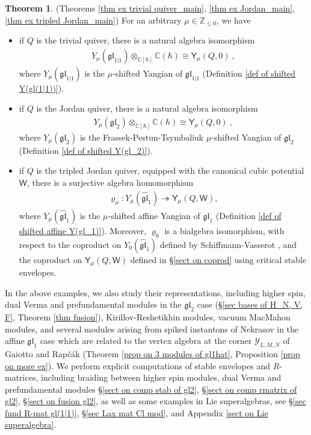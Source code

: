 \documentclass[10pt]{amsart}
\theoremstyle{definition}
\newtheorem{Theorem}{Theorem}[section]
\numberwithin{equation}{section}
\newcommand{\bC}{\mathbb{C}}
\newcommand{\bZ}{\mathbb{Z}}
\newcommand{\sW}{\mathsf{W}}
\begin{document}
\begin{Theorem}(Theorems \ref{thm ex trivial quiver_main}, \ref{thm ex Jordan_main}, \ref{thm ex tripled Jordan_main})
For an arbitrary $\mu\in \bZ_{\leqslant 0}$, we have 
\begin{itemize}
    \item if $Q$ is the trivial quiver, there is a natural algebra isomorphism
\begin{align*}
    Y_{\mu}(\mathfrak{gl}_{1|1})\otimes_{\bC[\hbar]} \bC(\hbar)\cong \mathsf Y_{\mu}(Q,0)\:,
\end{align*}
where $Y_{\mu}(\mathfrak{gl}_{1|1})$ is the 
$\mu$-shifted Yangian of $\mathfrak{gl}_{1|1}$ (Definition \ref{def of shifted Y(gl(1|1))}).
    \item if $Q$ is the Jordan quiver, there is a natural algebra isomorphism
\begin{align*}
    Y_{\mu}(\mathfrak{gl}_2)\otimes_{\bC[\hbar]} \bC(\hbar)\cong \mathsf Y_{\mu}(Q,0)\:,
\end{align*}
where $Y_{\mu}(\mathfrak{gl}_2)$ is the Frassek-Pestun-Tsymbaliuk 
$\mu$-shifted Yangian of $\mathfrak{gl}_2$ (Definition \ref{def of shifted Y(gl_2)}).
\item 
if $Q$ is the tripled Jordan quiver, equipped with the canonical cubic potential $\sW$,  there is a surjective algebra homomorphism
\begin{align*}
    \varrho_\mu\colon Y_{\mu}(\widehat{\mathfrak{gl}}_1)\twoheadrightarrow \mathsf Y_{\mu}(Q,\sW),
\end{align*}
where $Y_{\mu}(\widehat{\mathfrak{gl}}_1)$ is the $\mu$-shifted affine Yangian of $\mathfrak{gl}_1$ (Definition \ref{def of shifted affine Y(gl_1)}). Moreover, $\varrho_0$ is a bialgebra isomorphism, with respect to the coproduct on $Y_{0}(\widehat{\mathfrak{gl}}_1)$ defined by Schiffmann-Vasserot \cite{SV2}, and the coproduct on $\mathsf Y_{\mu}(Q,\sW)$ defined in \S \ref{sect on coprod} using critical stable envelopes.
\end{itemize}
\end{Theorem} 

In the above examples, we also study their representations, including 
higher spin, dual Verma and prefundamental modules in the $\mathfrak{gl}_2$ case (\S \ref{sec bases of H_N, V, F}, Theorem \ref{thm fusion}),  Kirillov-Reshetikhin modules, vacuum MacMahon modules, and several modules arising from spiked instantons of Nekrasov in the affine $\mathfrak{gl}_1$ case which are related to the vertex algebra at the corner $\mathcal Y_{L,M,N}$ of Gaiotto and Rap\v{c}\'{a}k (Theorem \ref{prop on 3 modules of gl1hat}, Proposition \ref{prop on more ex}). We perform explicit computations of stable envelopes and $R$-matrices, including braiding between higher spin modules, dual Verma and prefundamental modules \S \ref{sect on comp stab of gl2}, \S \ref{sect on comp rmatrix of gl2}, \S \ref{sect on fusion gl2}, as well as some examples in Lie superalgebras, see \S \ref{sec fund R-mat gl(1|1)}, \S \ref{sec Lax mat Cl mod}, and Appendix \ref{sect on Lie superalgebra}. 
\end{document}
